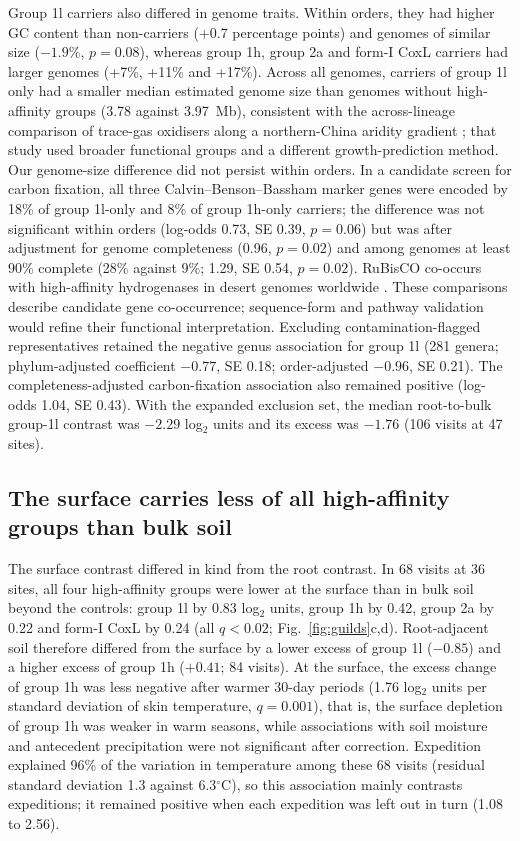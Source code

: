 \documentclass[11pt]{article}
\begin{document}
Group 1l carriers also differed in genome traits. Within orders, they had higher GC content than
non-carriers (+0.7 percentage points) and genomes of similar size ($-1.9\%$, $p=0.08$), whereas group 1h,
group 2a and form-I CoxL carriers had larger genomes (+7\%, +11\% and +17\%). Across all genomes, carriers
of group 1l only had a smaller median estimated genome size than genomes without high-affinity groups
(3.78 against 3.97~Mb), consistent with the across-lineage comparison of trace-gas oxidisers along a
northern-China aridity gradient \citep{wang2025genomesize}; that study used broader functional groups
and a different growth-prediction method. Our genome-size difference did not persist within orders. In a candidate screen for
carbon fixation, all three Calvin--Benson--Bassham marker genes were encoded by 18\% of group 1l-only and
8\% of group 1h-only carriers; the difference was not significant within orders (log-odds 0.73, SE 0.39,
$p=0.06$) but was after adjustment for genome completeness (0.96, $p=0.02$) and among genomes at least 90\%
complete (28\% against 9\%; 1.29, SE 0.54, $p=0.02$). RuBisCO co-occurs with high-affinity hydrogenases in
desert genomes worldwide \citep{leung2025aridity}. These comparisons describe candidate gene co-occurrence;
sequence-form and pathway validation would refine their functional interpretation. Excluding contamination-flagged
representatives retained the negative genus association for group 1l (281 genera; phylum-adjusted coefficient
$-0.77$, SE 0.18; order-adjusted $-0.96$, SE 0.21). The completeness-adjusted carbon-fixation association
also remained positive (log-odds 1.04, SE 0.43). With the expanded exclusion set, the median
root-to-bulk group-1l contrast was $-2.29$ log$_2$ units and its excess was $-1.76$ (106 visits at 47 sites).

\subsection*{The surface carries less of all high-affinity groups than bulk soil}
The surface contrast differed in kind from the root contrast. In 68 visits at 36 sites, all four
high-affinity groups were lower at the surface than in bulk soil beyond the controls: group 1l by 0.83
log$_2$ units, group 1h by 0.42, group 2a by 0.22 and form-I CoxL by 0.24 (all $q<0.02$;
Fig.~\ref{fig:guilds}c,d). Root-adjacent soil therefore differed from the surface by a lower excess of group
1l ($-0.85$) and a higher excess of group 1h ($+0.41$; 84 visits). At the surface, the excess change of
group 1h was less negative after warmer 30-day periods (1.76 log$_2$ units per standard deviation of skin
temperature, $q=0.001$), that is, the surface depletion of group 1h was weaker in warm seasons, while
associations with soil moisture and antecedent precipitation were not significant after correction.
Expedition explained 96\% of the variation in temperature among these 68 visits (residual standard deviation
1.3 against 6.3$^\circ$C), so this association mainly contrasts expeditions; it remained positive when each
expedition was left out in turn (1.08 to 2.56).
\end{document}
